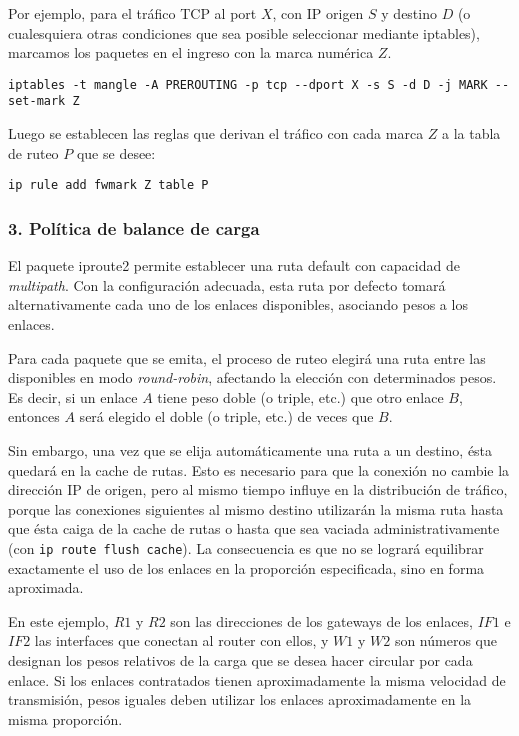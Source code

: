 Por ejemplo, para el tráfico TCP al port $X$, con IP origen $S$ y destino $D$ (o cualesquiera otras condiciones que sea posible seleccionar mediante iptables), marcamos los paquetes en el ingreso con la marca numérica $Z$.
\begin{lstlisting}
iptables -t mangle -A PREROUTING -p tcp --dport X -s S -d D -j MARK --set-mark Z
\end{lstlisting}

Luego se establecen las reglas que derivan el tráfico con cada marca $Z$ a la tabla de ruteo $P$ que se desee:
\begin{lstlisting}
ip rule add fwmark Z table P
\end{lstlisting}

\subsubsection{3. Política de balance de carga}
El paquete iproute2 permite establecer una ruta default con capacidad de \textit{multipath}. Con la configuración adecuada, esta ruta por defecto tomará alternativamente cada uno de los enlaces disponibles, asociando pesos a los enlaces. 

Para cada paquete que se emita, el proceso de ruteo elegirá una ruta entre las disponibles en modo \textit{round-robin}, afectando la elección con determinados pesos. Es decir, si un enlace $A$ tiene peso doble (o triple, etc.) que otro enlace $B$, entonces $A$ será elegido el doble (o triple, etc.) de veces que $B$. 

Sin embargo, una vez que se elija automáticamente una ruta a un destino, ésta quedará en la cache de rutas. Esto es necesario para que la conexión no cambie la dirección IP de origen, pero al mismo tiempo influye en la distribución de tráfico, porque las conexiones siguientes al mismo destino utilizarán la misma ruta hasta que ésta caiga de la cache de rutas o hasta que sea vaciada administrativamente (con \texttt{ip route flush cache}). La consecuencia es que no se logrará equilibrar exactamente el uso de los enlaces en la proporción especificada, sino en forma aproximada. 
  
En este ejemplo, $R1$ y $R2$ son las direcciones de los gateways de los enlaces, $IF1$ e $IF2$ las interfaces que conectan al router con ellos, y $W1$ y $W2$ son números que designan los pesos relativos de la carga que se desea hacer circular por cada enlace. Si los enlaces contratados tienen aproximadamente la misma velocidad de transmisión, pesos iguales deben utilizar los enlaces aproximadamente en la misma proporción.



